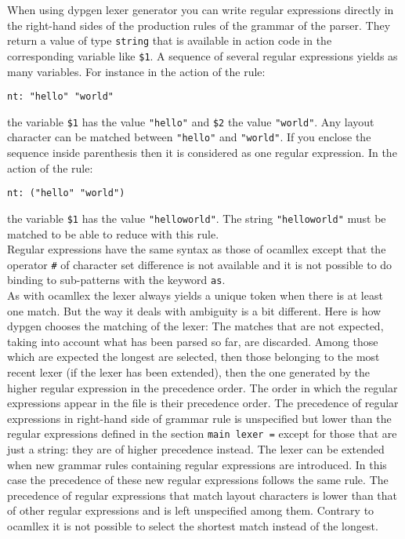 \documentclass[12pt]{article}
\begin{document}
{When using dypgen lexer generator you can write regular expressions directly in the right-hand sides of the production rules of the grammar of the parser. They return a value of type \verb|string| that is available in action code in the corresponding variable like \verb|$1|. A sequence of several regular expressions yields as many variables. For instance in the action of the rule:
\begin{verbatim}
nt: "hello" "world"
\end{verbatim}
the variable \verb|$1| has the value \verb|"hello"| and \verb|$2| the value \verb|"world"|. Any layout character can be matched between \verb|"hello"| and \verb|"world"|. If you enclose the sequence inside parenthesis then it is considered as one regular expression. In the action of the rule:
\begin{verbatim}
nt: ("hello" "world")
\end{verbatim}
the variable \verb|$1| has the value \verb|"helloworld"|. The string \verb|"helloworld"| must be matched to be able to reduce with this rule.\\

Regular expressions have the same syntax as those of ocamllex except that the operator \verb|#| of character set difference is not available and it is not possible to do binding to sub-patterns with the keyword \verb|as|.\\

As with ocamllex the lexer always yields a unique token when there is at least one match. But the way it deals with ambiguity is a bit different. Here is how dypgen chooses the matching of the lexer:
The matches that are not expected, taking into account what has been parsed so far, are discarded. Among those which are expected the longest are selected, then those belonging to the most recent lexer (if the lexer has been extended), then the one generated by the higher regular expression in the precedence order. The order in which the regular expressions appear in the file is their precedence order. The precedence of regular expressions in right-hand side of grammar rule is unspecified but lower than the regular expressions defined in the section \verb|main lexer =| except for those that are just a string: they are of higher precedence instead. The lexer can be extended when new grammar rules containing regular expressions are introduced. In this case the precedence of these new regular expressions follows the same rule. The precedence of regular expressions that match layout characters is lower than that of other regular expressions and is left unspecified among them. Contrary to ocamllex it is not possible to select the shortest match instead of the longest.\\

}
\end{document}
